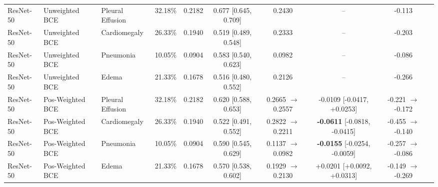 \begin{table}[!t]
{\begin{tabular}{lllccccccc}
\midrule
ResNet-50 & Unweighted BCE & Pleural Effusion & 32.18\% & 0.2182 & 0.677 [0.645, 0.709] & 0.2430 & -- & -0.113 \\
ResNet-50 & Unweighted BCE & Cardiomegaly & 26.33\% & 0.1940 & 0.519 [0.489, 0.548] & 0.2333 & -- & -0.203 \\
ResNet-50 & Unweighted BCE & Pneumonia & 10.05\% & 0.0904 & 0.583 [0.540, 0.623] & 0.0982 & -- & -0.086 \\
ResNet-50 & Unweighted BCE & Edema & 21.33\% & 0.1678 & 0.516 [0.480, 0.552] & 0.2126 & -- & -0.266 \\
\midrule
ResNet-50 & Pos-Weighted BCE & Pleural Effusion & 32.18\% & 0.2182 & 0.620 [0.588, 0.653] & 0.2665 $\to$ 0.2557 & -0.0109 [-0.0417, +0.0253] & -0.221 $\to$ -0.172 \\
ResNet-50 & Pos-Weighted BCE & Cardiomegaly & 26.33\% & 0.1940 & 0.522 [0.491, 0.552] & 0.2822 $\to$ 0.2211 & \textbf{-0.0611} [-0.0818, -0.0415] & -0.455 $\to$ -0.140 \\
ResNet-50 & Pos-Weighted BCE & Pneumonia & 10.05\% & 0.0904 & 0.590 [0.545, 0.629] & 0.1137 $\to$ 0.0982 & \textbf{-0.0155} [-0.0254, -0.0059] & -0.257 $\to$ -0.086 \\
ResNet-50 & Pos-Weighted BCE & Edema & 21.33\% & 0.1678 & 0.570 [0.538, 0.602] & 0.1929 $\to$ 0.2130 & +0.0201 [+0.0092, +0.0313] & -0.149 $\to$ -0.269 \\
\bottomrule
\end{tabular}%
}
\end{table}
